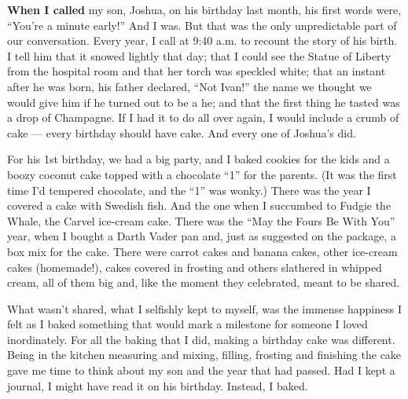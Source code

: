 \textbf{When I called} my son, Joshua, on his birthday last month, his
first words were, ``You're a minute early!'' And I was. But that was the
only unpredictable part of our conversation. Every year, I call at 9:40
a.m. to recount the story of his birth. I tell him that it snowed
lightly that day; that I could see the Statue of Liberty from the
hospital room and that her torch was speckled white; that an instant
after he was born, his father declared, ``Not Ivan!'' the name we
thought we would give him if he turned out to be a he; and that the
first thing he tasted was a drop of Champagne. If I had it to do all
over again, I would include a crumb of cake --- every birthday should
have cake. And every one of Joshua's did.

For his 1st birthday, we had a big party, and I baked cookies for the
kids and a boozy coconut cake topped with a chocolate ``1'' for the
parents. (It was the first time I'd tempered chocolate, and the ``1''
was wonky.) There was the year I covered a cake with Swedish fish. And
the one when I succumbed to Fudgie the Whale, the Carvel ice-cream cake.
There was the ``May the Fours Be With You'' year, when I bought a Darth
Vader pan and, just as suggested on the package, a box mix for the cake.
There were carrot cakes and banana cakes, other ice-cream cakes
(homemade!), cakes covered in frosting and others slathered in whipped
cream, all of them big and, like the moment they celebrated, meant to be
shared.

What wasn't shared, what I selfishly kept to myself, was the immense
happiness I felt as I baked something that would mark a milestone for
someone I loved inordinately. For all the baking that I did, making a
birthday cake was different. Being in the kitchen measuring and mixing,
filling, frosting and finishing the cake gave me time to think about my
son and the year that had passed. Had I kept a journal, I might have
read it on his birthday. Instead, I baked.

